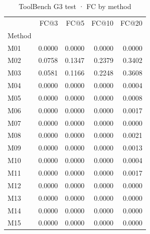 \begin{table}
\caption{ToolBench G3 test · FC by method}
\label{tab:ToolBench-G3-test-comparison-comparison-fullcoverage}
\begin{tabular}{lrrrr}
\toprule
 & FC@3 & FC@5 & FC@10 & FC@20 \\
Method &  &  &  &  \\
\midrule
M01 & 0.0000 & 0.0000 & 0.0000 & 0.0000 \\
M02 & 0.0758 & 0.1347 & 0.2379 & 0.3402 \\
M03 & 0.0581 & 0.1166 & 0.2248 & 0.3608 \\
M04 & 0.0000 & 0.0000 & 0.0000 & 0.0004 \\
M05 & 0.0000 & 0.0000 & 0.0000 & 0.0008 \\
M06 & 0.0000 & 0.0000 & 0.0000 & 0.0017 \\
M07 & 0.0000 & 0.0000 & 0.0000 & 0.0000 \\
M08 & 0.0000 & 0.0000 & 0.0000 & 0.0021 \\
M09 & 0.0000 & 0.0000 & 0.0000 & 0.0013 \\
M10 & 0.0000 & 0.0000 & 0.0000 & 0.0004 \\
M11 & 0.0000 & 0.0000 & 0.0000 & 0.0017 \\
M12 & 0.0000 & 0.0000 & 0.0000 & 0.0000 \\
M13 & 0.0000 & 0.0000 & 0.0000 & 0.0000 \\
M14 & 0.0000 & 0.0000 & 0.0000 & 0.0000 \\
M15 & 0.0000 & 0.0000 & 0.0000 & 0.0000 \\
\bottomrule
\end{tabular}
\end{table}
